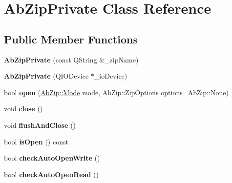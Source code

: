 \hypertarget{class_ab_zip_private}{}\section{Ab\+Zip\+Private Class Reference}
\label{class_ab_zip_private}
\subsection*{Public Member Functions}
\begin{DoxyCompactItemize}
\item 
{\bfseries Ab\+Zip\+Private} (const Q\+String \&\+\_\+zip\+Name)\hypertarget{class_ab_zip_private_a4b9446dc9341e2ca9bb46003a3ce0b19}{}\label{class_ab_zip_private_a4b9446dc9341e2ca9bb46003a3ce0b19}

\item 
{\bfseries Ab\+Zip\+Private} (Q\+I\+O\+Device $\ast$\+\_\+io\+Device)\hypertarget{class_ab_zip_private_a560fc257b354f557310b37c9db4c5c51}{}\label{class_ab_zip_private_a560fc257b354f557310b37c9db4c5c51}

\item 
bool {\bfseries open} (\hyperlink{class_ab_zip_ad24114feac0d38566f6b36f5fc0db54e}{Ab\+Zip\+::\+Mode} mode, Ab\+Zip\+::\+Zip\+Options options=Ab\+Zip\+::\+None)\hypertarget{class_ab_zip_private_adb85555f5f818b2afa2348aaa68d73da}{}\label{class_ab_zip_private_adb85555f5f818b2afa2348aaa68d73da}

\item 
void {\bfseries close} ()\hypertarget{class_ab_zip_private_accee77a58af834eb4a68071e4950f6f6}{}\label{class_ab_zip_private_accee77a58af834eb4a68071e4950f6f6}

\item 
void {\bfseries flush\+And\+Close} ()\hypertarget{class_ab_zip_private_ad503bba30b170e1b2b1fae3e2a4e5c03}{}\label{class_ab_zip_private_ad503bba30b170e1b2b1fae3e2a4e5c03}

\item 
bool {\bfseries is\+Open} () const \hypertarget{class_ab_zip_private_a0bc0a973feb9ff7f5a776013c8131a3e}{}\label{class_ab_zip_private_a0bc0a973feb9ff7f5a776013c8131a3e}

\item 
bool {\bfseries check\+Auto\+Open\+Write} ()\hypertarget{class_ab_zip_private_a7d199196f7c51afceb093eb6b0465763}{}\label{class_ab_zip_private_a7d199196f7c51afceb093eb6b0465763}

\item 
bool {\bfseries check\+Auto\+Open\+Read} ()\hypertarget{class_ab_zip_private_ae4bf08ed224d162e40f060aeb337c75b}{}\label{class_ab_zip_private_ae4bf08ed224d162e40f060aeb337c75b}


\end{DoxyCompactItemize}
